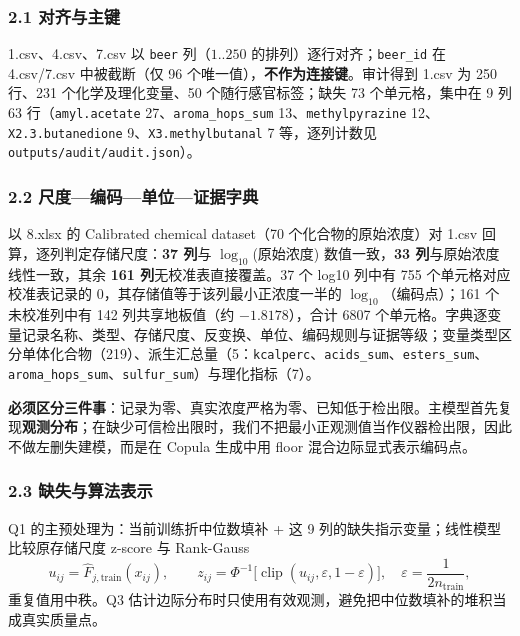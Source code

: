\documentclass[
  11pt,
]{article}
\begin{document}
\subsubsection{2.1 对齐与主键}\label{ux5bf9ux9f50ux4e0eux4e3bux952e}

1.csv、4.csv、7.csv 以 \texttt{beer} 列（\(1..250\)
的排列）逐行对齐；\texttt{beer\_id} 在 4.csv/7.csv 中被截断（仅 96
个唯一值），\textbf{不作为连接键}。审计得到 1.csv 为 250 行、231
个化学及理化变量、50 个随行感官标签；缺失 73 个单元格，集中在 9 列 63
行（\texttt{amyl.acetate} 27、\texttt{aroma\_hops\_sum}
13、\texttt{methylpyrazine} 12、\texttt{X2.3.butanedione}
9、\texttt{X3.methylbutanal} 7 等，逐列计数见
\texttt{outputs/audit/audit.json}）。

\subsubsection{2.2
尺度---编码---单位---证据字典}\label{ux5c3aux5ea6ux7f16ux7801ux5355ux4f4dux8bc1ux636eux5b57ux5178}

以 8.xlsx 的 Calibrated chemical dataset（70 个化合物的原始浓度）对
1.csv 回算，逐列判定存储尺度：\textbf{37 列}与 \(\log_{10}\)(原始浓度)
数值一致，\textbf{33 列}与原始浓度线性一致，其余 \textbf{161
列}无校准表直接覆盖。37 个 log10 列中有 755 个单元格对应校准表记录的
0，其存储值等于该列最小正浓度一半的 \(\log_{10}\)（编码点）；161
个未校准列中有 142 列共享地板值（约 \(-1.8178\)），合计 6807
个单元格。字典逐变量记录名称、类型、存储尺度、反变换、单位、编码规则与证据等级；变量类型区分单体化合物（219）、派生汇总量（5：\texttt{kcalperc}、\texttt{acids\_sum}、\texttt{esters\_sum}、\texttt{aroma\_hops\_sum}、\texttt{sulfur\_sum}）与理化指标（7）。

\textbf{必须区分三件事}：记录为零、真实浓度严格为零、已知低于检出限。主模型首先复现\textbf{观测分布}；在缺少可信检出限时，我们不把最小正观测值当作仪器检出限，因此不做左删失建模，而是在
Copula 生成中用 floor 混合边际显式表示编码点。

\subsubsection{2.3
缺失与算法表示}\label{ux7f3aux5931ux4e0eux7b97ux6cd5ux8868ux793a}

Q1 的主预处理为：当前训练折中位数填补 + 这 9
列的缺失指示变量；线性模型比较原存储尺度 z-score 与 Rank-Gauss \[
u_{ij}=\widehat F_{j,\mathrm{train}}(x_{ij}),\qquad z_{ij}=\Phi^{-1}\big[\operatorname{clip}(u_{ij},\varepsilon,1-\varepsilon)\big],\quad \varepsilon=\frac{1}{2n_{\mathrm{train}}},
\] 重复值用中秩。Q3
估计边际分布时只使用有效观测，避免把中位数填补的堆积当成真实质量点。
\end{document}
